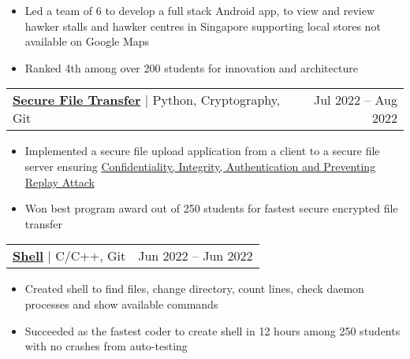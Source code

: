 \documentclass[letterpaper,11pt]{article}
\makeatletter
\newcommand{\resumeItem}[1]{
  \item\small{
    {#1 \vspace{-2.5pt}}
  }
}
\newcommand{\resumeProjectHeading}[2]{
    \item
    \begin{tabular*}{0.97\textwidth}{l@{\extracolsep{\fill}}r}
      \small#1 & \footnotesize#2 \\
    \end{tabular*}\vspace{-7pt}
}
\newcommand{\resumeItemListStart}{\begin{itemize}}
\newcommand{\resumeItemListEnd}{\end{itemize}\vspace{-5pt}}
\makeatother
\begin{document}
          \resumeItemListStart
            \resumeItem{Led a team of 6 to develop a full stack Android app, to view and review hawker stalls and hawker centres in Singapore supporting local stores not available on Google Maps}
            \resumeItem{Ranked 4th among over 200 students for innovation and architecture}
          \resumeItemListEnd

     

                  \resumeProjectHeading
          {\textbf{{\href{https://github.com/Usgupta/pa_2}{{\faLink} Secure File Transfer}}} $|$ {Python, Cryptography, Git}}{Jul 2022 -- Aug 2022}
          \resumeItemListStart
          
            \resumeItem{Implemented a secure file upload application from a client to a secure file server ensuring \ul{Confidentiality, Integrity, Authentication and Preventing Replay Attack}}
            \resumeItem{Won best program award out of 250 students for fastest secure encrypted file transfer}
           
          \resumeItemListEnd

        \resumeProjectHeading
          {\textbf{{\href{https://github.com/Usgupta/shell}{{\faLink} Shell}}} $|$ {C/C++, Git}}	{Jun 2022 -- Jun 2022}
          \resumeItemListStart
            \resumeItem{Created shell to find files, change directory, count lines, check daemon processes and show available commands}
            \resumeItem{Succeeded as the fastest coder to create shell in 12 hours among 250 students with no crashes from auto-testing}
          \resumeItemListEnd
          

    
      
          
       
\end{document}
